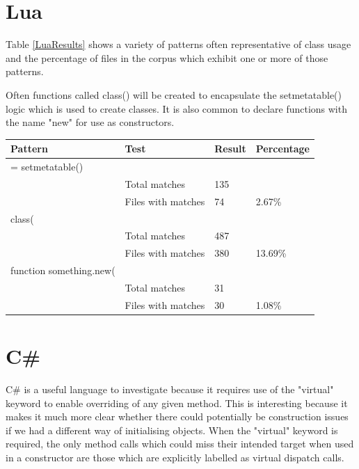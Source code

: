 \section{Lua}
Table \ref{LuaResults} shows a variety of patterns often representative of class usage and the percentage of files in the corpus which exhibit one or more of those patterns.\newline

Often functions called class() will be created to encapsulate the setmetatable() logic which is used to create classes. It is also common to declare functions with the name "new" for use as constructors.

\begin{center}
	\label{LuaResults}
	\begin{tabular}{|l|l|l|l|}
		\hline
		Pattern                 & Test               & Result & Percentage \\ \hline
		= setmetatable()        &                    &        &            \\ \hline
		& Total matches      & 135    &            \\ \hline
		& Files with matches & 74     & 2.67\%     \\ \hline
		class(                  &                    &        &            \\ \hline
		& Total matches      & 487    &            \\ \hline
		& Files with matches & 380    & 13.69\%    \\ \hline
		function something.new( &                    &        &            \\ \hline
		& Total matches      & 31     &            \\ \hline
		& Files with matches & 30     & 1.08\%     \\ \hline
	\end{tabular}
\end{center}{

\section{C\#}
C\# is a useful language to investigate because it requires use of the "virtual" keyword to enable overriding of any given method. This is interesting because it makes it much more clear whether there could potentially be construction issues if we had a different way of initialising objects. When the "virtual" keyword is required, the only method calls which could miss their intended target when used in a constructor are those which are explicitly labelled as virtual dispatch calls.

}

